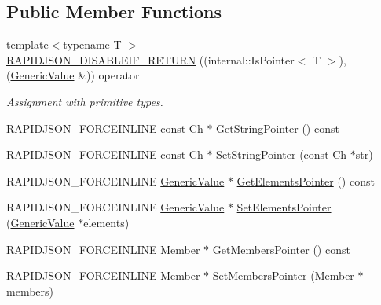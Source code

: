 \subsection*{Public Member Functions}
\begin{DoxyCompactItemize}
\item 
{\footnotesize template$<$typename T $>$ }\\\hyperlink{classGenericValue_a4a4418a93777942e1fb7ea71f8aaf680}{R\+A\+P\+I\+D\+J\+S\+O\+N\+\_\+\+D\+I\+S\+A\+B\+L\+E\+I\+F\+\_\+\+R\+E\+T\+U\+RN} ((internal\+::\+Is\+Pointer$<$ T $>$),(\hyperlink{classGenericValue}{Generic\+Value} \&)) operator
\begin{DoxyCompactList}\small\item\em Assignment with primitive types. \end{DoxyCompactList}\item 
R\+A\+P\+I\+D\+J\+S\+O\+N\+\_\+\+F\+O\+R\+C\+E\+I\+N\+L\+I\+NE const \hyperlink{classGenericValue_ade0e0ce64ccd5d852da57a35e720bafb}{Ch} $\ast$ \hyperlink{classGenericValue_a0f54466a07c496300b15987e1b1915f8}{Get\+String\+Pointer} () const
\item 
R\+A\+P\+I\+D\+J\+S\+O\+N\+\_\+\+F\+O\+R\+C\+E\+I\+N\+L\+I\+NE const \hyperlink{classGenericValue_ade0e0ce64ccd5d852da57a35e720bafb}{Ch} $\ast$ \hyperlink{classGenericValue_aa3d65011422b4aba50bf035b21a522e1}{Set\+String\+Pointer} (const \hyperlink{classGenericValue_ade0e0ce64ccd5d852da57a35e720bafb}{Ch} $\ast$str)
\item 
R\+A\+P\+I\+D\+J\+S\+O\+N\+\_\+\+F\+O\+R\+C\+E\+I\+N\+L\+I\+NE \hyperlink{classGenericValue}{Generic\+Value} $\ast$ \hyperlink{classGenericValue_aea7b87806555825ab36ebaaff57440bf}{Get\+Elements\+Pointer} () const
\item 
R\+A\+P\+I\+D\+J\+S\+O\+N\+\_\+\+F\+O\+R\+C\+E\+I\+N\+L\+I\+NE \hyperlink{classGenericValue}{Generic\+Value} $\ast$ \hyperlink{classGenericValue_ad8ac8518160251babea5065f9eea8982}{Set\+Elements\+Pointer} (\hyperlink{classGenericValue}{Generic\+Value} $\ast$elements)
\item 
R\+A\+P\+I\+D\+J\+S\+O\+N\+\_\+\+F\+O\+R\+C\+E\+I\+N\+L\+I\+NE \hyperlink{classGenericValue_a7ccf27c44058b4c11c3efc6473afb886}{Member} $\ast$ \hyperlink{classGenericValue_a04412a15687feb103f917cdd91b32298}{Get\+Members\+Pointer} () const
\item 
R\+A\+P\+I\+D\+J\+S\+O\+N\+\_\+\+F\+O\+R\+C\+E\+I\+N\+L\+I\+NE \hyperlink{classGenericValue_a7ccf27c44058b4c11c3efc6473afb886}{Member} $\ast$ \hyperlink{classGenericValue_a0b488cb0120b154eadde27dc0e694019}{Set\+Members\+Pointer} (\hyperlink{classGenericValue_a7ccf27c44058b4c11c3efc6473afb886}{Member} $\ast$members)

\end{DoxyCompactItemize}
